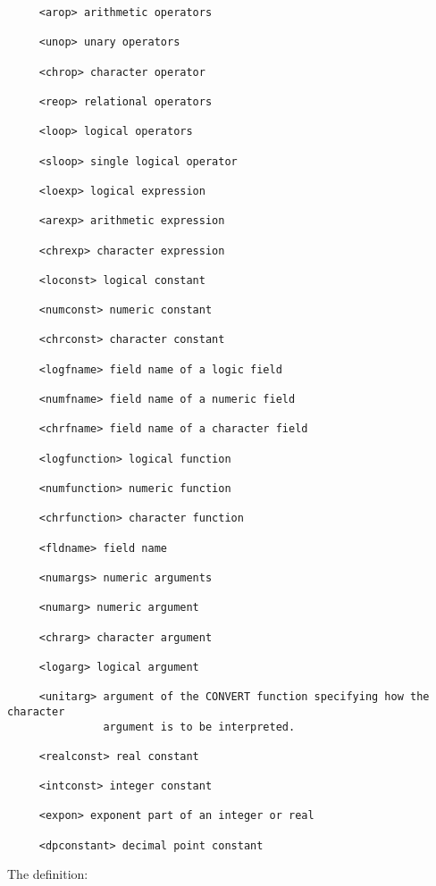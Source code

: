 \begin{small}
\begin{verbatim}
     <arop> arithmetic operators  

     <unop> unary operators 

     <chrop> character operator  

     <reop> relational operators  

     <loop> logical operators 

     <sloop> single logical operator

     <loexp> logical expression
     
     <arexp> arithmetic expression
     
     <chrexp> character expression
     
     <loconst> logical constant
     
     <numconst> numeric constant
     
     <chrconst> character constant
     
     <logfname> field name of a logic field 
     
     <numfname> field name of a numeric field
     
     <chrfname> field name of a character field
     
     <logfunction> logical function
     
     <numfunction> numeric function
     
     <chrfunction> character function
     
     <fldname> field name

     <numargs> numeric arguments

     <numarg> numeric argument

     <chrarg> character argument

     <logarg> logical argument

     <unitarg> argument of the CONVERT function specifying how the character
               argument is to be interpreted.

     <realconst> real constant

     <intconst> integer constant

     <expon> exponent part of an integer or real

     <dpconstant> decimal point constant
\end{verbatim}
\end{small}

The definition:

